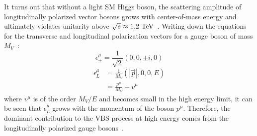 It turns out that without a light SM Higgs boson, the scattering amplitude of longitudinally polarized vector bosons grows with center-of-mass energy and ultimately violates unitarity above $\sqrt{s}\approx 1.2\tev$~\cite{1977.ben-lee-weak-interactions, 2009.strong-gauge-boson-scattering}.
Writing down the equations for the transverse and longitudinal polarization vectors for a gauge boson of mass $M_V$~\cite{1990.strong-ww-scattering}:
\begin{equation}
  \epsilon^{\mu}_{\pm} = \frac{1}{\sqrt{2}}(0,0,\pm i, 0)
\end{equation}
\begin{equation}
  \begin{aligned}
    \epsilon^{\mu}_L &= \frac{1}{M_V}(|\vec{p}|, 0, 0, E)\\
                    &= \frac{p^{\mu}}{M_V}+v^{\mu}
  \end{aligned}
  \label{eq:longitudinal_polarization}
\end{equation}
where $v^{\mu}$ is of the order $M_V/E$ and becomes small in the high energy limit, it can be seen that $\epsilon^{\mu}_{L}$ grows with the momentum of the boson $p^{\mu}$.
Therefore, the dominant contribution to the VBS process at high energy comes from the longitudinally polarized gauge bosons~\cite{2012.vbs-thesis-oord}.

